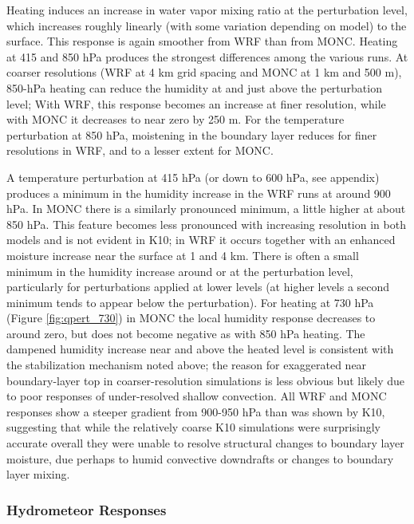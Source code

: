 \documentclass[draft]{agujournal2019}
\begin{document}
Heating induces an increase in water vapor mixing ratio at the perturbation
level, which increases roughly linearly (with some variation depending on model)
to the surface. This response is again smoother from WRF than from MONC. Heating
at 415 and 850 hPa produces the strongest differences among the various runs. At
coarser resolutions (WRF at 4 km grid spacing and MONC at 1 km and 500 m),
850-hPa heating can reduce the humidity at and just above the perturbation
level; With WRF, this response becomes an increase at finer resolution, while
with MONC it decreases to near zero by 250 m. For the temperature perturbation
at 850 hPa, moistening in the boundary layer reduces for finer resolutions in
WRF, and to a lesser extent for MONC. 

A temperature perturbation at 415 hPa (or down to 600 hPa, see appendix)
produces a minimum in the humidity increase in the WRF runs at around 900 hPa.
In MONC there is a similarly pronounced minimum, a little higher at about 850
hPa. This feature becomes less pronounced with increasing resolution in both
models and is not evident in K10; in WRF it occurs together with an enhanced
moisture increase near the surface at 1 and 4 km. There is often a small minimum
in the humidity increase around or at the perturbation level, particularly for
perturbations applied at lower levels (at higher levels a second minimum tends
to appear below the perturbation). For heating at 730 hPa (Figure
\ref{fig:qpert_730}) in MONC the local humidity response decreases to around
zero, but does not become negative as with 850 hPa heating. The dampened
humidity increase near and above the heated level is consistent with the
stabilization mechanism noted above; the reason for exaggerated near
boundary-layer top in coarser-resolution simulations is less obvious but likely
due to poor responses of under-resolved shallow convection. All WRF and MONC
responses show a steeper gradient from 900-950 hPa than was shown by K10,
suggesting that while the relatively coarse K10 simulations were surprisingly
accurate overall they were unable to resolve structural changes to boundary
layer moisture, due perhaps to humid convective downdrafts or changes to
boundary layer mixing.

\subsubsection{Hydrometeor Responses}
\end{document}
